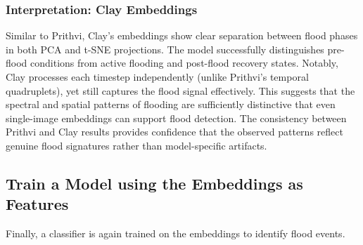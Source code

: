\documentclass[
  letterpaper,
  DIV=11,
  numbers=noendperiod]{scrreprt}
\begin{document}
\subsubsection{Interpretation: Clay
Embeddings}\label{interpretation-clay-embeddings}

Similar to Prithvi, Clay's embeddings show clear separation between
flood phases in both PCA and t-SNE projections. The model successfully
distinguishes pre-flood conditions from active flooding and post-flood
recovery states. Notably, Clay processes each timestep independently
(unlike Prithvi's temporal quadruplets), yet still captures the flood
signal effectively. This suggests that the spectral and spatial patterns
of flooding are sufficiently distinctive that even single-image
embeddings can support flood detection. The consistency between Prithvi
and Clay results provides confidence that the observed patterns reflect
genuine flood signatures rather than model-specific artifacts.

\subsection{Train a Model using the Embeddings as
Features}\label{train-a-model-using-the-embeddings-as-features-1}

Finally, a classifier is again trained on the embeddings to identify
flood events.
\end{document}
